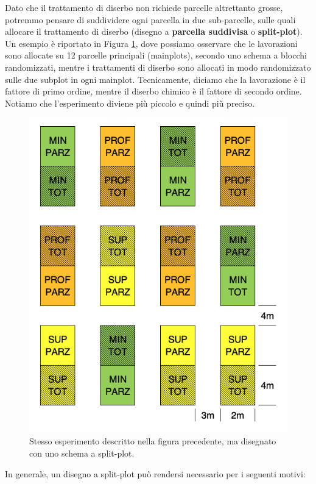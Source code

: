 \documentclass[a4paper,12pt,oneside]{book}
\begin{document}
Dato che il trattamento di diserbo non richiede parcelle altrettanto grosse, potremmo pensare di suddividere ogni parcella in due sub-parcelle, sulle quali allocare il trattamento di diserbo (disegno a \textbf{parcella suddivisa} o \textbf{split-plot}). Un esempio è riportato in Figura \ref{fig:figName38}, dove possiamo osservare che le lavorazioni sono allocate su 12 parcelle principali (mainplots), secondo uno schema a blocchi randomizzati, mentre i trattamenti di diserbo sono allocati in modo randomizzato sulle due subplot in ogni mainplot. Tecnicamente, diciamo che la lavorazione è il fattore di primo ordine, mentre il diserbo chimico è il fattore di secondo ordine. Notiamo che l'esperimento diviene più piccolo e quindi più preciso.

\begin{figure}

{\centering \includegraphics[width=0.75\linewidth]{_images/Mappa3split} 

}

\caption{Stesso esperimento descritto nella figura precedente, ma disegnato con uno schema a split-plot.}\label{fig:figName38}
\end{figure}

In generale, un disegno a split-plot può rendersi necessario per i seguenti motivi:
\end{document}

